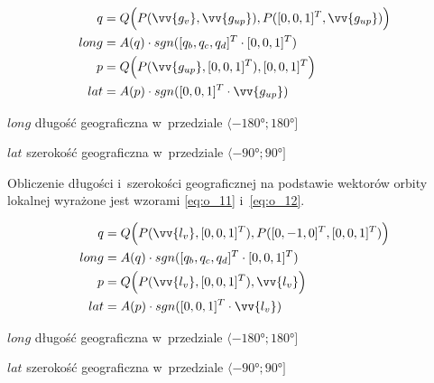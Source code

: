 \begin{samepage}
  \begin{align}
    q &= Q\Big(P(\vv{g_v}, \vv{g_{up}}), P([0, 0, 1]^T, \vv{g_{up}})\Big) \\
    \label{eq:o_9}
    long &= A(q) \cdot sgn([q_b, q_c, q_d]^T \cdot [0, 0, 1]^T) \\
    p &= Q\Big(P(\vv{g_{up}}, [0, 0, 1]^T), [0, 0, 1]^T\Big) \\
    \label{eq:o_10}
    lat &= A(p) \cdot sgn([0, 0, 1]^T \cdot \vv{g_{up}})
  \end{align}
\begin{eqexpl}[25mm]
    \item {$long$} długość geograficzna w~przedziale $\langle\ang{-180}; \ang{180}\rbrack$
    \item {$lat$} szerokość geograficzna w~przedziale $\langle\ang{-90}; \ang{90}\rbrack$
\end{eqexpl}
  \vspace{\baselineskip}
\end{samepage}

Obliczenie długości i~szerokości geograficznej na podstawie wektorów orbity lokalnej wyrażone jest wzorami \ref{eq:o_11} i~\ref{eq:o_12}.

\begin{samepage}
  \begin{align}
    q &= Q\Big(P(\vv{l_v}, [0, 0, 1]^T), P([0, -1, 0]^T, [0, 0, 1]^T)\Big) \\
    \label{eq:o_11}
    long &= A(q) \cdot sgn([q_b, q_c, q_d]^T \cdot [0, 0, 1]^T) \\
    p &= Q\Big(P(\vv{l_{v}}, [0, 0, 1]^T), \vv{l_{v}}\Big) \\
    \label{eq:o_12}
    lat &= A(p) \cdot sgn([0, 0, 1]^T \cdot \vv{l_{v}})
  \end{align}
\begin{eqexpl}[25mm]
    \item {$long$} długość geograficzna w~przedziale $\langle\ang{-180}; \ang{180}\rbrack$
    \item {$lat$} szerokość geograficzna w~przedziale $\langle\ang{-90}; \ang{90}\rbrack$
\end{eqexpl}
  \vspace{\baselineskip}
\end{samepage}

